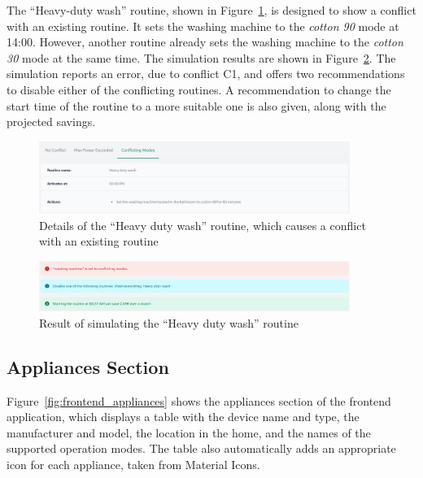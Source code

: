 The ``Heavy-duty wash'' routine, shown in Figure~\ref{fig:frontend_conflicting_modes}, is designed to show a conflict with an existing routine. It sets the washing machine to the \textit{cotton 90} mode at 14:00. However, another routine already sets the washing machine to the \textit{cotton 30} mode at the same time. The simulation results are shown in Figure~\ref{fig:frontend_conflicting_modes_result}. The simulation reports an error, due to conflict C1, and offers two recommendations to disable either of the conflicting routines. A recommendation to change the start time of the routine to a more suitable one is also given, along with the projected savings.

\begin{figure}
    \centering
    \includegraphics[width=0.9\textwidth]{images/frontend/conflicting_modes.png}
    \caption{Details of the ``Heavy duty wash'' routine, which causes a conflict with an existing routine}%
    \label{fig:frontend_conflicting_modes}
\end{figure}

\begin{figure}
    \centering
    \includegraphics[width=0.9\textwidth]{images/frontend/conflicting_modes_result.png}
    \caption{Result of simulating the ``Heavy duty wash'' routine}%
    \label{fig:frontend_conflicting_modes_result}
\end{figure}

\subsection{Appliances Section}

Figure~\ref{fig:frontend_appliances} shows the appliances section of the frontend application, which displays a table with the device name and type, the manufacturer and model, the location in the home, and the names of the supported operation modes. The table also automatically adds an appropriate icon for each appliance, taken from Material Icons.

